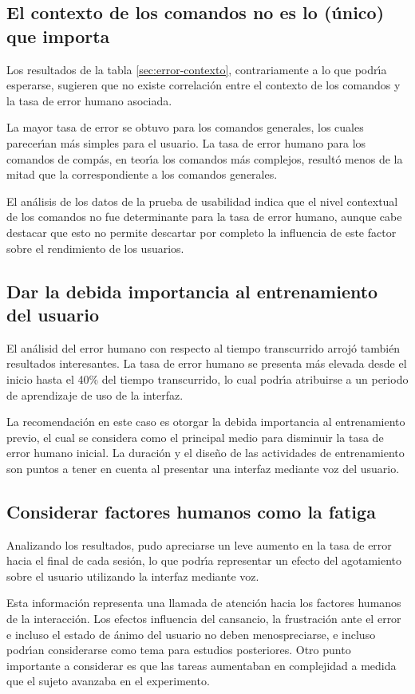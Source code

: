 \subsection{El contexto de los comandos no es lo (\'unico) que importa}
Los resultados de la tabla \ref{sec:error-contexto}, contrariamente a lo que podr{\'\i}a esperarse,
sugieren que no existe correlaci\'on entre el contexto de los comandos y la tasa de error humano asociada.

La mayor tasa de error se obtuvo para los comandos generales, los cuales parecer{\'\i}an m\'as simples 
para el usuario. La tasa de error humano para los comandos de comp\'as, 
en teor{\'\i}a los comandos m\'as complejos,
result\'o menos de la mitad que la correspondiente a los comandos generales.

El an\'alisis de los datos de la prueba de usabilidad indica que el nivel contextual de los comandos no
fue determinante para la tasa de error humano, aunque cabe destacar que esto no permite descartar
por completo la influencia de este factor sobre el rendimiento de los usuarios.


\subsection{Dar la debida importancia al entrenamiento del usuario}
El an\'alisid del error humano con respecto al tiempo transcurrido arroj\'o tambi\'en
resultados interesantes. La tasa de error humano se presenta m\'as elevada desde el inicio hasta
el 40\% del tiempo transcurrido, lo cual podr{{\'\i}}a atribuirse a un periodo de aprendizaje
de uso de la interfaz.

La recomendaci\'on en este caso es otorgar la debida importancia al entrenamiento previo,
el cual se considera como el principal medio para disminuir la tasa de error humano inicial.
La duraci\'on y el dise\~no de las actividades de entrenamiento son puntos a tener en cuenta
al presentar una interfaz mediante voz del usuario.

\subsection{Considerar factores humanos como la fatiga}
Analizando los resultados, pudo apreciarse un leve aumento en la tasa de error hacia el final de
cada sesi\'on, lo que podr{{\'\i}}a representar un efecto del agotamiento sobre el usuario utilizando la
interfaz mediante voz.

Esta informaci\'on representa una llamada de atenci\'on hacia los factores humanos de la interacci\'on.
Los efectos influencia del cansancio, la frustraci\'on ante el error e incluso el estado de \'animo
del usuario no deben menospreciarse, e incluso podr{\'\i}an considerarse como tema para estudios
posteriores. Otro punto importante a considerar es que las tareas aumentaban en complejidad a medida que
el sujeto avanzaba en el experimento.

